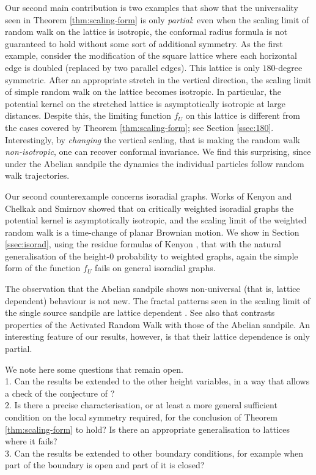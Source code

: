 \documentclass[11pt]{article}
\theoremstyle{remark}
\begin{document}
Our second main contribution is two examples that show that the universality seen in 
Theorem \ref{thm:scaling-form} is only \emph{partial}: even when the scaling limit of random walk 
on the lattice is isotropic, the conformal radius formula is not guaranteed to hold
without some sort of additional symmetry. As the first example, consider the 
modification of the square lattice where each horizontal edge is doubled (replaced 
by two parallel edges). This lattice is only $180$-degree symmetric. After an 
appropriate stretch in the vertical direction, the scaling limit of simple random 
walk on the lattice becomes isotropic. In particular, the potential kernel on the 
stretched lattice is asymptotically isotropic at large distances. Despite this, the 
limiting function $f_U$ on this lattice is different from the cases covered by 
Theorem \ref{thm:scaling-form}; see Section \ref{ssec:180}. Interestingly, by 
\emph{changing} the vertical scaling, that is making the random walk \emph{non-isotropic},
one can recover conformal invariance. We find this surprising, since under the
Abelian sandpile the dynamics the individual particles follow random walk trajectories.

Our second counterexample concerns isoradial graphs. Works of Kenyon \cite{K02} and 
Chelkak and Smirnov \cite{CS11} showed that on critically weighted isoradial graphs the 
potential kernel is asymptotically isotropic, and the scaling limit of the weighted random walk 
is a time-change of planar Brownian motion. We show in Section \ref{ssec:isorad}, 
using the residue formulas of Kenyon \cite{K02}, that with the natural generalisation 
of the height-$0$ probability to weighted graphs, again the simple form 
of the function $f_U$ fails on general isoradial graphs.

The observation that the Abelian sandpile shows non-universal (that is, lattice dependent)
behaviour is not new. The fractal patterns seen in the scaling limit of the single source
sandpile are lattice dependent \cite{LPS17}. See also \cite[Section 10]{LS24} that contrasts 
properties of the Activated Random Walk with those of the Abelian sandpile. An interesting 
feature of our results, however, is that their lattice dependence is only partial.

We note here some questions that remain open. \\
1. Can the results be extended to the other height variables, in a way 
that allows a check of the conjecture of \cite{JPR06}? \\
2. Is there a precise characterisation, or at least a more general sufficient condition 
on the local symmetry required, for the conclusion of Theorem \ref{thm:scaling-form} to hold?
Is there an appropriate generalisation to lattices where it fails? \\
3. Can the results be extended to other boundary conditions, for example when part of the boundary is open and part of it is closed? \\
\end{document}
